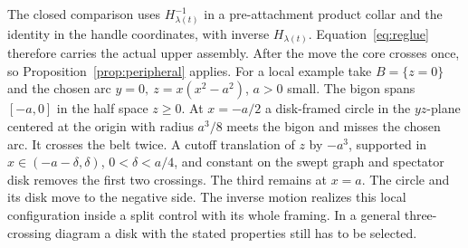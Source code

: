 \documentclass[11pt,letterpaper]{article}
\numberwithin{equation}{section}
\theoremstyle{remark}
\begin{document}
The closed comparison uses \(H_{\lambda(t)}^{-1}\) in a
pre-attachment product collar and the identity in the handle
coordinates, with inverse \(H_{\lambda(t)}\).
Equation~\eqref{eq:reglue} therefore carries the actual upper
assembly. After the move the core crosses once, so
Proposition~\ref{prop:peripheral} applies.
For a local example take \(B=\{z=0\}\) and the chosen arc
\(y=0,\ z=x(x^2-a^2)\), \(a>0\) small. The bigon spans
\([-a,0]\) in the half space \(z\ge0\).
At \(x=-a/2\) a disk-framed circle in the \(yz\)-plane
centered at the origin with radius \(a^3/8\) meets the
bigon and misses the chosen arc. It crosses the belt twice.
A cutoff translation of \(z\) by \(-a^3\), supported in
\(x\in(-a-\delta,\delta)\), \(0<\delta<a/4\), and constant
on the swept graph and spectator disk removes the first two
crossings. The third remains at \(x=a\). The circle and its
disk move to the negative side. The inverse motion realizes
this local configuration inside a split control with its
whole framing. In a general three-crossing diagram a disk
with the stated properties still has to be selected.
\end{document}
